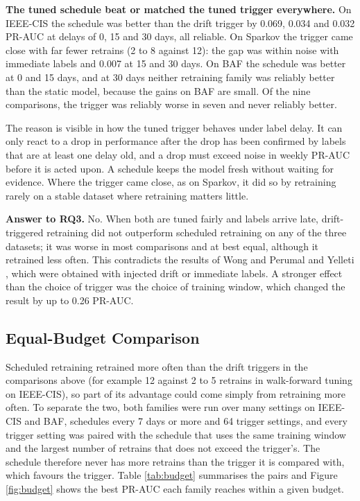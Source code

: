 \textbf{The tuned schedule beat or matched the tuned trigger everywhere.} On IEEE-CIS the schedule was better than the drift trigger by 0.069, 0.034 and 0.032 PR-AUC at delays of 0, 15 and 30 days, all reliable. On Sparkov the trigger came close with far fewer retrains (2 to 8 against 12): the gap was within noise with immediate labels and 0.007 at 15 and 30 days. On BAF the schedule was better at 0 and 15 days, and at 30 days neither retraining family was reliably better than the static model, because the gains on BAF are small. Of the nine comparisons, the trigger was reliably worse in seven and never reliably better.

The reason is visible in how the tuned trigger behaves under label delay. It can only react to a drop in performance after the drop has been confirmed by labels that are at least one delay old, and a drop must exceed noise in weekly PR-AUC before it is acted upon. A schedule keeps the model fresh without waiting for evidence. Where the trigger came close, as on Sparkov, it did so by retraining rarely on a stable dataset where retraining matters little.

\textbf{Answer to RQ3.} No. When both are tuned fairly and labels arrive late, drift-triggered retraining did not outperform scheduled retraining on any of the three datasets; it was worse in most comparisons and at best equal, although it retrained less often. This contradicts the results of Wong and Perumal \cite{wong2025} and Yelleti \cite{yelleti2025}, which were obtained with injected drift or immediate labels. A stronger effect than the choice of trigger was the choice of training window, which changed the result by up to 0.26 PR-AUC.

\subsection{Equal-Budget Comparison}\label{sec:budget}

Scheduled retraining retrained more often than the drift triggers in the comparisons above (for example 12 against 2 to 5 retrains in walk-forward tuning on IEEE-CIS), so part of its advantage could come simply from retraining more often. To separate the two, both families were run over many settings on IEEE-CIS and BAF, schedules every 7 days or more and 64 trigger settings, and every trigger setting was paired with the schedule that uses the same training window and the largest number of retrains that does not exceed the trigger's. The schedule therefore never has more retrains than the trigger it is compared with, which favours the trigger. Table \ref{tab:budget} summarises the pairs and Figure \ref{fig:budget} shows the best PR-AUC each family reaches within a given budget.

